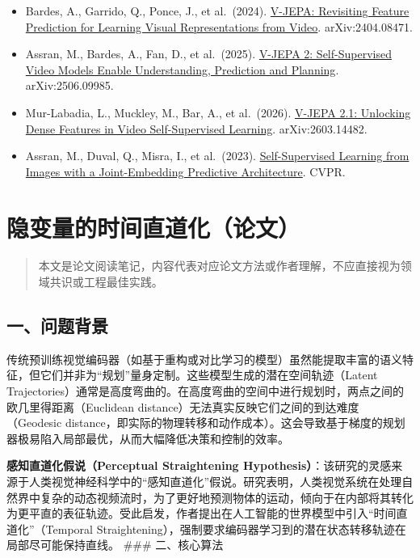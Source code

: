\begin{itemize}
\tightlist
\item
  Bardes, A., Garrido, Q., Ponce, J., et al.~(2024). \href{https://arxiv.org/abs/2404.08471}{V-JEPA: Revisiting Feature Prediction for Learning Visual Representations from Video}. arXiv:2404.08471.
\item
  Assran, M., Bardes, A., Fan, D., et al.~(2025). \href{https://arxiv.org/abs/2506.09985}{V-JEPA 2: Self-Supervised Video Models Enable Understanding, Prediction and Planning}. arXiv:2506.09985.
\item
  Mur-Labadia, L., Muckley, M., Bar, A., et al.~(2026). \href{https://arxiv.org/abs/2603.14482}{V-JEPA 2.1: Unlocking Dense Features in Video Self-Supervised Learning}. arXiv:2603.14482.
\item
  Assran, M., Duval, Q., Misra, I., et al.~(2023). \href{https://arxiv.org/abs/2301.08243}{Self-Supervised Learning from Images with a Joint-Embedding Predictive Architecture}. CVPR.
\end{itemize}

\clearpage

\hypertarget{ux9690ux53d8ux91cfux7684ux65f6ux95f4ux76f4ux9053ux5316ux8bbaux6587}{%
\section{隐变量的时间直道化（论文）}\label{ux9690ux53d8ux91cfux7684ux65f6ux95f4ux76f4ux9053ux5316ux8bbaux6587}}

\begin{quote}
本文是论文阅读笔记，内容代表对应论文方法或作者理解，不应直接视为领域共识或工程最佳实践。
\end{quote}

\hypertarget{ux4e00ux95eeux9898ux80ccux666f-13}{%
\subsection{一、问题背景}\label{ux4e00ux95eeux9898ux80ccux666f-13}}

传统预训练视觉编码器（如基于重构或对比学习的模型）虽然能提取丰富的语义特征，但它们并非为``规划''量身定制。这些模型生成的潜在空间轨迹（Latent Trajectories）通常是高度弯曲的。在高度弯曲的空间中进行规划时，两点之间的欧几里得距离（Euclidean distance）无法真实反映它们之间的到达难度（Geodesic distance，即实际的物理转移和动作成本）。这会导致基于梯度的规划器极易陷入局部最优，从而大幅降低决策和控制的效率。

\textbf{感知直道化假说（Perceptual Straightening Hypothesis）}：该研究的灵感来源于人类视觉神经科学中的``感知直道化''假说。研究表明，人类视觉系统在处理自然界中复杂的动态视频流时，为了更好地预测物体的运动，倾向于在内部将其转化为更平直的表征轨迹。受此启发，作者提出在人工智能的世界模型中引入``时间直道化''（Temporal Straightening），强制要求编码器学习到的潜在状态转移轨迹在局部尽可能保持直线。
\#\#\# 二、核心算法

